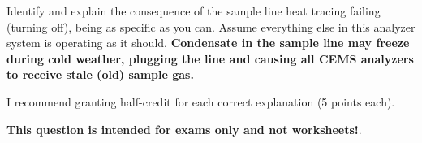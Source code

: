 \vskip 10pt

Identify and explain the consequence of the sample line heat tracing failing (turning off), being as specific as you can.  Assume everything else in this analyzer system is operating as it should.  {\bf Condensate in the sample line may freeze during cold weather, plugging the line and causing all CEMS analyzers to receive stale (old) sample gas.}

\vskip 10pt

I recommend granting half-credit for each correct explanation (5 points each).







{\bf This question is intended for exams only and not worksheets!}.


